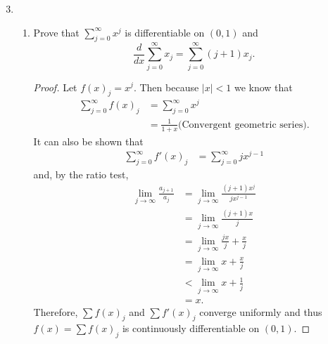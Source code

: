 \documentclass{article}
\begin{document}
\begin{enumerate}
      \setcounter{enumi}{2}
      \item \begin{enumerate}
                  \item Prove that $\sum_{j=0}^\infty x^j$ is differentiable
                        on $(0,1)$ and
                        \[
                              \frac{d}{dx}\sum_{j=0}^\infty x_j= \sum_{j=0}^\infty(j+1)x_j.
                        \]
                        \begin{proof}
                              Let $f(x)_j=x^j$. Then because $\lvert x\rvert<1$ we know that
                              \begin{align*}
                                    \sum_{j=0}^\infty f(x)_j & = \sum_{j=0}^\infty x^j                                 \\
                                                             & = \frac{1}{1+x} \textrm{(Convergent geometric series)}.
                              \end{align*}
                              It can also be shown that
                              \begin{align*}
                                    \sum_{j=0}^\infty f'(x)_j & = \sum_{j=0}^\infty jx^{j-1}
                              \end{align*}
                              and, by the ratio test,
                              \begin{align*}
                                    \lim_{j\to\infty}\frac{a_{j+1}}{a_j} & = \lim_{j\to\infty} \frac{(j+1)x^j}{jx^{j-1}}  \\
                                                                         & = \lim_{j\to\infty} \frac{(j+1)x}{j}           \\
                                                                         & = \lim_{j\to\infty} \frac{jx}{j} + \frac{x}{j} \\
                                                                         & = \lim_{j\to\infty} x + \frac{x}{j}            \\
                                                                         & < \lim_{j\to\infty} x + \frac{1}{j}            \\
                                                                         & = x.
                              \end{align*}
                              Therefore, $\sum f(x)_j$ and $\sum f'(x)_j$ converge uniformly and thus
                              $f(x)=\sum f(x)_j$ is continuously differentiable on $(0,1)$.


\end{proof}
\end{enumerate}
\end{enumerate}
\end{document}
